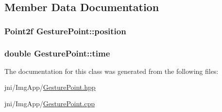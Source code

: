 \subsection{\-Member \-Data \-Documentation}
\hypertarget{class_gesture_point_a1c868ede675da84e759c5b34f842a091}{
\subsubsection[{position}]{\setlength{\rightskip}{0pt plus 5cm}\-Point2f {\bf \-Gesture\-Point\-::position}}}\label{class_gesture_point_a1c868ede675da84e759c5b34f842a091}
\hypertarget{class_gesture_point_acc9f7fa1c65945e4dc2a1b41cedd7e9b}{
\subsubsection[{time}]{\setlength{\rightskip}{0pt plus 5cm}double {\bf \-Gesture\-Point\-::time}}}\label{class_gesture_point_acc9f7fa1c65945e4dc2a1b41cedd7e9b}


\-The documentation for this class was generated from the following files\-:\begin{DoxyCompactItemize}
\item 
jni/\-Img\-App/\hyperlink{_gesture_point_8hpp}{\-Gesture\-Point.\-hpp}\item 
jni/\-Img\-App/\hyperlink{_gesture_point_8cpp}{\-Gesture\-Point.\-cpp}\end{DoxyCompactItemize}
